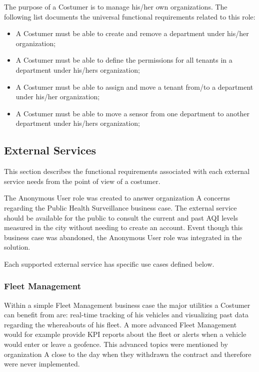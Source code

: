 The purpose of a Costumer is to manage his/her own organizations.
The following list documents the universal functional requirements related to this role:

\begin{itemize}
    \item A Costumer must be able to create and remove a department under his/her organization;
    \item A Costumer must be able to define the permissions for all tenants in a department under his/hers organization;
    \item A Costumer must be able to assign and move a tenant from/to a department under his/her organization;
    \item A Costumer must be able to move a sensor from one department to another department under his/hers organization;
\end{itemize}

\subsection{External Services}
\label{subsec:requirements:functional:services}

This section describes the functional requirements associated with each external service needs from the point of view of a costumer.

The Anonymous User role was created to answer organization A concerns regarding the Public Health Surveillance business case. The external service should be available for the public to consult the current and past \gls{AQI} levels measured in the city without needing to create an account. Event though this business case was abandoned, the Anonymous User role was integrated in the solution.

Each supported external service has specific use cases defined below.

\subsubsection{Fleet Management}
\label{subsubsec:requirements:functional:services:fleet}

Within a simple Fleet Management business case the major utilities a Costumer can benefit from are: real-time tracking of his vehicles and visualizing past data regarding the whereabouts of his fleet. A more advanced Fleet Management would for example provide \gls{KPI} reports about the fleet or alerts when a vehicle would enter or leave a geofence. This advanced topics were mentioned by organization A close to the day when they withdrawn the contract and therefore were never implemented.

